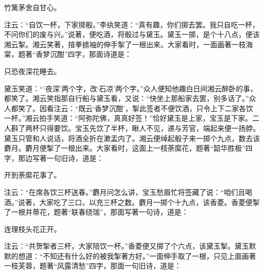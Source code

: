 \begin{poem}
    \begin{pl}竹篱茅舍自甘心。\end{pl}

\end{poem}


\begin{parag}
    注云：“自饮一杯，下家掷骰。”李纨笑道：“真有趣，你们掷去罢。我只自吃一杯，不问你们的废与兴。”说著，便吃酒，将骰过与黛玉。黛玉一掷，是个十八点，便该湘云掣。湘云笑著，揎拳掳袖的伸手掣了一根出来。大家看时，一面画著一枝海棠，题著“香梦沉酣”四字，那面诗道是：
\end{parag}


\begin{poem}
    \begin{pl}只恐夜深花睡去。\end{pl}
\end{poem}


\begin{parag}
    黛玉笑道：“‘夜深’两个字，改‘石凉’两个字。”众人便知他趣白日间湘云醉卧的事，都笑了。湘云笑指那自行船与黛玉看，又说：“快坐上那船家去罢，别多话了。”众人都笑了。因看注云：“既云‘香梦沉酣’，掣此签者不便饮酒，只令上下二家各饮一杯。”湘云拍手笑道：“阿弥陀佛，真真好签！”恰好黛玉是上家，宝玉是下家。二人斟了两杯只得要饮。宝玉先饮了半杯，瞅人不见，递与芳官，端起来便一扬脖。黛玉只管和人说话，将酒全折在漱盂内了。湘云便绰起骰子来一掷个九点，数去该麝月。麝月便掣了一根出来。大家看时，这面上一枝荼縻花，题著“韶华胜极”四字，那边写著一句旧诗，道是：
\end{parag}


\begin{poem}
    \begin{pl}开到荼縻花事了。\end{pl}
\end{poem}


\begin{parag}
    注云：“在席各饮三杯送春。”麝月问怎么讲，宝玉愁眉忙将签藏了说：“咱们且喝酒。”说著，大家吃了三口，以充三杯之数。麝月一掷个十九点，该香菱。香菱便掣了一根并蒂花，题著“联春绕瑞”，那面写著一句诗，道是：
\end{parag}


\begin{poem}
    \begin{pl}连理枝头花正开。\end{pl}
\end{poem}


\begin{parag}
    注云：“共贺掣者三杯，大家陪饮一杯。”香菱便又掷了个六点，该黛玉掣。黛玉默默的想道：“不知还有什么好的被我掣著方好。”一面伸手取了一根，只见上面画著一枝芙蓉，题著“风露清愁”四字，那面一句旧诗，道是：
\end{parag}



